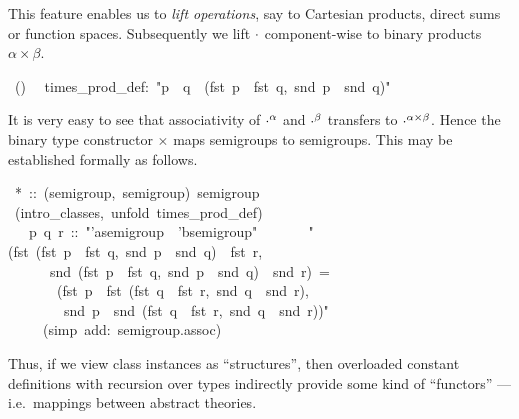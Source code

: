 \begin{isabelle}
\begin{isamarkuptext}
 This feature enables us to \emph{lift operations}, say to Cartesian
 products, direct sums or function spaces.  Subsequently we lift
 $\cdot$ component-wise to binary products $\alpha \times \beta$.%
\end{isamarkuptext}%
~()\isanewline
~~times\_prod\_def:~{"}p~{\isasymOtimes}~q~{\isasymequiv}~(fst~p~{\isasymOtimes}~fst~q,~snd~p~{\isasymOtimes}~snd~q){"}%
\begin{isamarkuptext}%
It is very easy to see that associativity of $\cdot^\alpha$ and
 $\cdot^\beta$ transfers to ${\cdot}^{\alpha \times \beta}$.  Hence
 the binary type constructor $\times$ maps semigroups to semigroups.
 This may be established formally as follows.%
\end{isamarkuptext}%
~*~::~(semigroup,~semigroup)~semigroup\isanewline
{}~(intro\_classes,~unfold~times\_prod\_def)\isanewline
~~~p~q~r~::~{"}'a{\isasymColon}semigroup~{\isasymtimes}~'b{\isasymColon}semigroup{"}\isanewline
~~\isanewline
~~~~{"}(fst~(fst~p~{\isasymOtimes}~fst~q,~snd~p~{\isasymOtimes}~snd~q)~{\isasymOtimes}~fst~r,\isanewline
~~~~~~snd~(fst~p~{\isasymOtimes}~fst~q,~snd~p~{\isasymOtimes}~snd~q)~{\isasymOtimes}~snd~r)~=\isanewline
~~~~~~~(fst~p~{\isasymOtimes}~fst~(fst~q~{\isasymOtimes}~fst~r,~snd~q~{\isasymOtimes}~snd~r),\isanewline
~~~~~~~~snd~p~{\isasymOtimes}~snd~(fst~q~{\isasymOtimes}~fst~r,~snd~q~{\isasymOtimes}~snd~r)){"}\isanewline
~~~~~(simp~add:~semigroup.assoc)\isanewline
{}%
\begin{isamarkuptext}%
Thus, if we view class instances as ``structures'', then overloaded
 constant definitions with recursion over types indirectly provide
 some kind of ``functors'' --- i.e.\ mappings between abstract
 theories.%
\end{isamarkuptext}%
\end{isabelle}%
